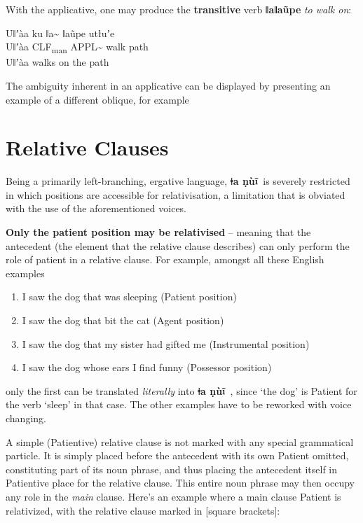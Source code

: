 \documentclass[11pt]{book}
\newcommand{\qcn}[1]{\textbf{#1}}
\newcommand{\langname}{\qcn{ǂa ṇùĩ}~}
\newcommand{\transl}[2]{\qcn{#1} \emph{#2}}
\newcommand{\grammsc}[1]{\textsc{#1}}
\newcommand{\CLF}[1]{\grammsc{CLF}\textsubscript{#1}}
\begin{document}
With the applicative, one may produce the \textbf{transitive} verb \transl{ǁaǁaũpe}{to walk on}:

\begin{exe}
\ex
\gll Uǁʼàa ku ǁa\textasciitilde{} ǁaũpe utłuʼe \\
Uǁʼàa \CLF{man} APPL\textasciitilde{} walk path \\
\glt Uǁʼàa walks on the path
\end{exe}

The ambiguity inherent in an applicative can be displayed by presenting an example of a different oblique, for example

\section{Relative Clauses}\label{sec:relative}

Being a primarily left-branching, ergative language, \langname is severely restricted in which positions are accessible for relativisation, a limitation that is obviated with the use of the aforementioned voices.

\textbf{Only the patient position may be relativised} -- meaning that the antecedent (the element that the relative clause describes) can only perform the role of patient in a relative clause. For example, amongst all these English examples

\begin{enumerate}
\item I saw the dog that was sleeping (Patient position)
\item I saw the dog that bit the cat (Agent position)
\item I saw the dog that my sister had gifted me (Instrumental position)
\item I saw the dog whose ears I find funny (Possessor position)
\end{enumerate}

only the first can be translated \emph{literally} into \langname, since `the dog' is Patient for the verb `sleep' in that case. The other examples have to be reworked with voice changing.

A simple (Patientive) relative clause is not marked with any special grammatical particle. It is simply placed before the antecedent with its own Patient omitted, constituting part of its noun phrase, and thus placing the antecedent itself in Patientive place for the relative clause. This entire noun phrase may then occupy any role in the \emph{main} clause. Here's an example where a main clause Patient is relativized, with the relative clause marked in [square brackets]:
\end{document}
